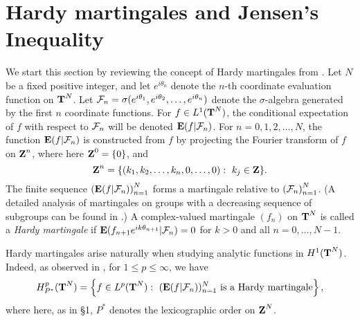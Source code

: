 \section{Hardy martingales and Jensen's Inequality}
\newtheorem{prop1}{Proposition}[section]
\newtheorem{prop2}[prop1]{Proposition}
\newtheorem{density}[prop1]{Lemma}
We start this section by reviewing the concept of Hardy martingales
from \cite{gar}.
Let $N$ be a fixed positive integer, and let
$e^{i\theta_n}$ denote the $n$-th coordinate evaluation function on $\T^N$.
Let ${\cal F}_n=\sigma(e^{i\theta_1},e^{i\theta_2},\ldots,e^{i\theta_n})$
denote the $\sigma$-algebra generated by the first $n$ coordinate functions.
For $f\in L^1(\T^N)$, the conditional expectation of $f$
with respect to ${\cal F}_n$ will be denoted 
$\E(f|\cF_n)$.  For $n=0,1,2,\ldots,N$, the function 
$\E(f|\cF_n)$
is constructed from $f$  
by projecting the Fourier transform of $f$ 
on $\Z^n$, where here $\Z^0=\{0\}$, and
$$\Z^n=\{(k_1,k_2,\ldots,k_n,0,\ldots,0):\ k_j\in \Z\}.$$
The finite sequence 
$\left(  \E(f|\cF_n) \right)_{n=1}^N$ forms a martingale relative to  $\left({\cal F}_n\right)_{n=1}^N$.
(A detailed analysis of martingales on groups
with a decreasing sequence of subgroups
can be found in \cite[Chapter 5]{eg}.)
A complex-valued martingale $(f_n)$
on $\T^N$ is called a {\em Hardy martingale} if 
$\E(f_{n+1}e^{ik \theta_{n+1}}|\cF_n)=0$ for $k>0$ and all $n=0,\ldots,N-1$.

Hardy martingales arise naturally when studying
analytic functions in $H^1(\T^N)$.
Indeed, as observed in \cite{gar}, for $1\leq p\leq \infty$, 
we have
\begin{equation}
H^p_{P^*}(\T^N)=\left\{f\in L^p(\T^N):\ (\E(f|\cF_n))_{n=1}^N
\ {\rm is\ a \ Hardy\ martingale } \right\},
\label{hp*}
\end{equation}
where here, as in \S 1, 
$P^*$ denotes the lexicographic order on $\Z^N$.

